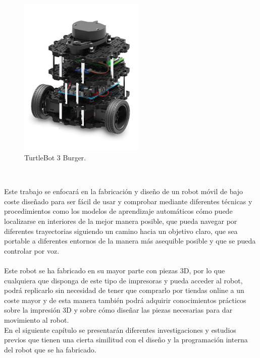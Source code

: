\begin{figure} [h!]
  \begin{center}
    \includegraphics[width=6cm]{figs/turtlebot3burguer.jpg}
  \end{center}
  \caption{TurtleBot 3 Burger.}
  \label{fig:turtlebot}
\end{figure}\


Este trabajo se enfocará en la fabricación y diseño de un robot móvil de bajo coste diseñado para ser fácil de usar y comprobar mediante diferentes técnicas y procedimientos como los modelos de aprendizaje automáticos cómo puede localizarse en interiores de la mejor manera posible, que pueda navegar por diferentes trayectorias siguiendo un camino hacia un objetivo claro, que sea portable a diferentes entornos de la manera más asequible posible y que se pueda controlar por voz.\\ \\ Este robot se ha fabricado en su mayor parte con piezas 3D, por lo que cualquiera que disponga de este tipo de impresoras y pueda acceder al robot, podrá replicarlo sin necesidad de tener que comprarlo por tiendas online a un coste mayor y de esta manera también podrá adquirir conocimientos prácticos sobre la impresión 3D y sobre cómo diseñar las piezas necesarias para dar movimiento al robot. \\

En el siguiente capítulo se presentarán diferentes investigaciones y estudios previos que tienen una cierta similitud con el diseño y la programación interna del robot que se ha fabricado.

\vspace{15cm} %







